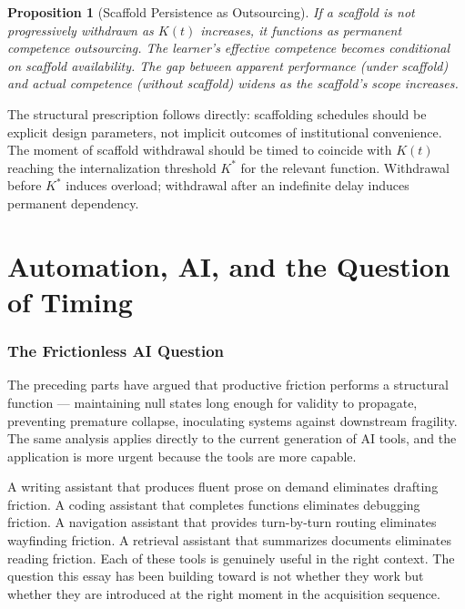 \documentclass[11pt]{article}
\newtheorem{proposition}{Proposition}
\theoremstyle{remark}
\begin{document}
\begin{proposition}[Scaffold Persistence as Outsourcing]
\label{prop:scaffold_persistence}
If a scaffold is not progressively withdrawn as $K(t)$ increases, it functions as permanent competence outsourcing. The learner's effective competence becomes conditional on scaffold availability. The gap between apparent performance (under scaffold) and actual competence (without scaffold) widens as the scaffold's scope increases.
\end{proposition}

The structural prescription follows directly: scaffolding schedules should be explicit design parameters, not implicit outcomes of institutional convenience. The moment of scaffold withdrawal should be timed to coincide with $K(t)$ reaching the internalization threshold $K^*$ for the relevant function. Withdrawal before $K^*$ induces overload; withdrawal after an indefinite delay induces permanent dependency.


\part{Automation, AI, and the Question of Timing}
\label{part:ai}

\section{The Frictionless AI Question}
\label{sec:ai_friction}

The preceding parts have argued that productive friction performs a structural function --- maintaining null states long enough for validity to propagate, preventing premature collapse, inoculating systems against downstream fragility. The same analysis applies directly to the current generation of AI tools, and the application is more urgent because the tools are more capable.

A writing assistant that produces fluent prose on demand eliminates drafting friction. A coding assistant that completes functions eliminates debugging friction. A navigation assistant that provides turn-by-turn routing eliminates wayfinding friction. A retrieval assistant that summarizes documents eliminates reading friction. Each of these tools is genuinely useful in the right context. The question this essay has been building toward is not whether they work but whether they are introduced at the right moment in the acquisition sequence.
\end{document}
